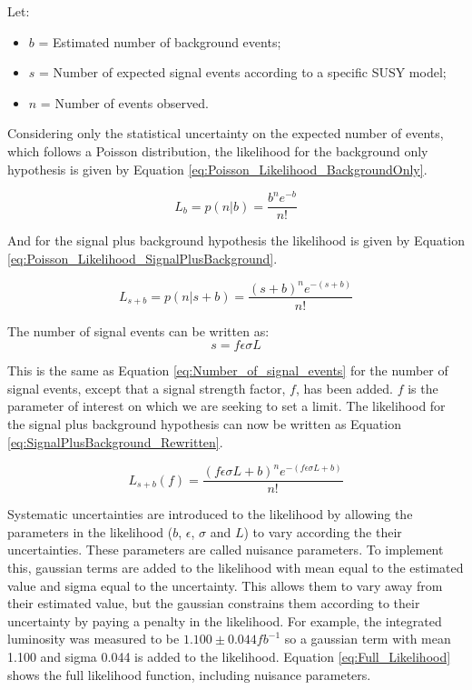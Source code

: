 Let: 
\begin{itemize}
\item $b$ = Estimated number of background events;
\item $s$ = Number of expected signal events according to a specific SUSY model;
\item $n$ = Number of events observed.
\end{itemize}

Considering only the statistical uncertainty on the expected number of events, 
which follows a Poisson distribution, the likelihood for the background only 
hypothesis is given by Equation \ref{eq:Poisson_Likelihood_BackgroundOnly}.

\begin{equation}
L_{b} = p(n|b) = \frac{b^{n}e^{-b}}{n!} 
\label{eq:Poisson_Likelihood_BackgroundOnly}
\end{equation}

And for the signal plus background hypothesis the likelihood is given by Equation
\ref{eq:Poisson_Likelihood_SignalPlusBackground}.

\begin{equation}
L_{s+b} = p(n|s+b) = \frac{(s+b)^{n}e^{-(s+b)}}{n!} 
\label{eq:Poisson_Likelihood_SignalPlusBackground}
\end{equation}

The number of signal events can be written as:
\begin{equation}
s = f\epsilon\sigma L
\label{eq:fsig}
\end{equation}

This is the same as Equation \ref{eq:Number_of_signal_events} for the number of 
signal events, except that a signal strength factor, $f$, has been added. $f$ is 
the parameter of interest on which we are seeking to set a limit. The likelihood 
for the signal plus background hypothesis can now be written as Equation 
\ref{eq:SignalPlusBackground_Rewritten}. 

\begin{equation}
L_{s+b}(f) = \frac{(f\epsilon \sigma L + b)^{n} e^{-(f\epsilon \sigma L + b)}}{n!} 
\label{eq:SignalPlusBackground_Rewritten}
\end{equation}

Systematic uncertainties are introduced to the likelihood by allowing the 
parameters in the likelihood ($b$, $\epsilon$, $\sigma$ and $L$) to vary 
according the their uncertainties. These parameters are called nuisance 
parameters. To implement this, gaussian terms are added to the likelihood with 
mean equal to the estimated value and sigma equal to the uncertainty. This 
allows them to vary away from their estimated value, but the gaussian constrains 
them according to their uncertainty by paying a penalty in the likelihood. For 
example, the integrated luminosity was measured to be $1.100\pm0.044 
\unit{fb^{-1}}$ so a gaussian term with mean 1.100 and sigma 0.044 is added to 
the likelihood. Equation \ref{eq:Full_Likelihood} shows the full likelihood 
function, including nuisance parameters. 

